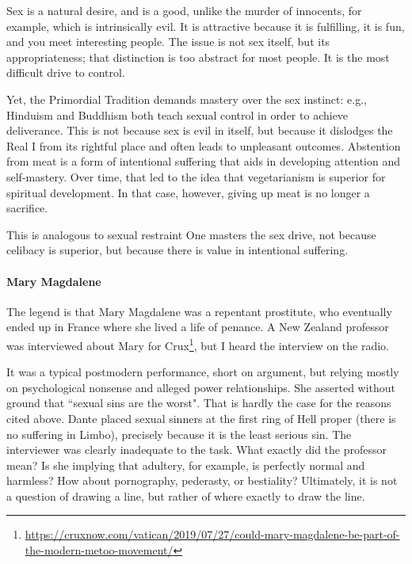 \begin{quotex}
Sex is a natural desire, and is a good, unlike the murder of innocents, for example, which is intrinsically evil. It is attractive because it is fulfilling, it is fun, and you meet interesting people. The issue is not sex itself, but its appropriateness; that distinction is too abstract for most people. It is the most difficult drive to control. 

\end{quotex}
Yet, the Primordial Tradition demands mastery over the sex instinct: e.g., Hinduism and Buddhism both teach sexual control in order to achieve deliverance. This is not because sex is evil in itself, but because it dislodges the Real I from its rightful place and often leads to unpleasant outcomes. Abstention from meat is a form of intentional suffering that aids in developing attention and self-mastery. Over time, that led to the idea that vegetarianism is superior for spiritual development. In that case, however, giving up meat is no longer a sacrifice.

This is analogous to sexual restraint One masters the sex drive, not because celibacy is superior, but because there is value in intentional suffering.

\paragraph{Mary Magdalene}
The legend is that Mary Magdalene was a repentant prostitute, who eventually ended up in France where she lived a life of penance. A New Zealand professor was interviewed about Mary for Crux\footnote{\url{https://cruxnow.com/vatican/2019/07/27/could-mary-magdalene-be-part-of-the-modern-metoo-movement/}}, but I heard the interview on the radio.

It was a typical postmodern performance, short on argument, but relying mostly on psychological nonsense and alleged power relationships. She asserted without ground that ``sexual sins are the worst". That is hardly the case for the reasons cited above. Dante placed sexual sinners at the first ring of Hell proper (there is no suffering in Limbo), precisely because it is the least serious sin. The interviewer was clearly inadequate to the task. What exactly did the professor mean? Is she implying that adultery, for example, is perfectly normal and harmless? How about pornography, pederasty, or bestiality? Ultimately, it is not a question of drawing a line, but rather of where exactly to draw the line.

